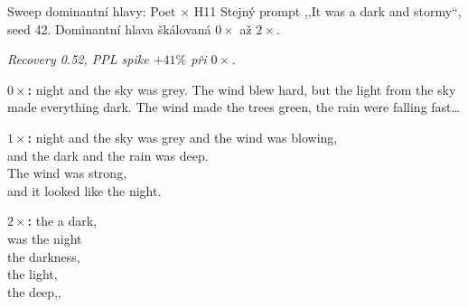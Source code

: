 \documentclass[aspectratio=169,10pt]{beamer}
\newcommand{\qlabel}[1]{{\normalfont\bfseries\color{accBlack}#1}}
\begin{document}
\begin{frame}[t]{Sweep dominantní hlavy: Poet $\times$ H11}
  \vspace{2mm}
  {\small Stejný prompt ,,It was a dark and stormy``, seed 42. Dominantní hlava škálovaná $0\times$ až $2\times$.}\par\vspace{1mm}
  {\footnotesize\color{mutedText}\itshape Recovery 0.52, PPL spike $+41\%$ při $0\times$.}\par\vspace{4mm}

  {\small
  \begin{quotebox}
    \qlabel{$0\times$:} night and the sky was grey. The wind blew hard, but the light from the sky made everything dark. The wind made the trees green, the rain were falling fast\ldots\par
  \end{quotebox}
  \begin{quotebox}[featSlate!18]
    \qlabel{$1\times$:} night and the sky was grey and the wind was blowing,\\and the dark and the rain was deep.\\The wind was strong,\\and it looked like the night.\par
  \end{quotebox}
  \begin{quotebox}[accRed!12]
    \qlabel{$2\times$:} the a dark,\\was the night\\the darkness,\\the light,\\the deep,,\par
  \end{quotebox}
  }
\end{frame}

\end{document}
